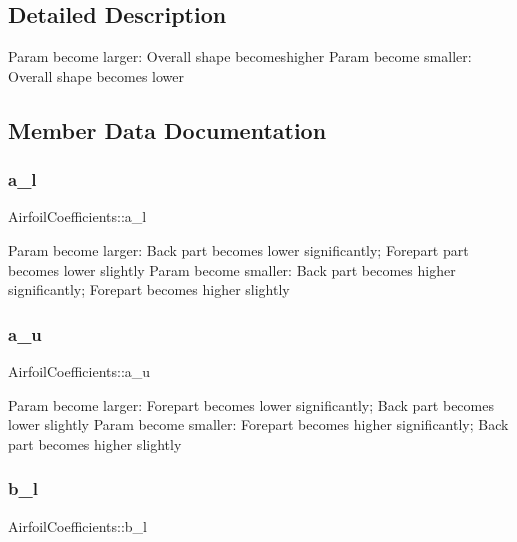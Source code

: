 \subsection{Detailed Description}
Param become larger\+: Overall shape becomeshigher Param become smaller\+: Overall shape becomes lower 

\subsection{Member Data Documentation}
\hypertarget{struct_airfoil_coefficients_a9b8421053a97ec5dcf0bc1cc6dd7e2a1}{}\label{struct_airfoil_coefficients_a9b8421053a97ec5dcf0bc1cc6dd7e2a1} 
\subsubsection{\texorpdfstring{a\+\_\+l}{a\_l}}
{\footnotesize\ttfamily Airfoil\+Coefficients\+::a\+\_\+l}

Param become larger\+: Back part becomes lower significantly; Forepart part becomes lower slightly Param become smaller\+: Back part becomes higher significantly; Forepart becomes higher slightly \hypertarget{struct_airfoil_coefficients_a7987ccdf3ca120dc8b96004cea2808c4}{}\label{struct_airfoil_coefficients_a7987ccdf3ca120dc8b96004cea2808c4} 
\subsubsection{\texorpdfstring{a\+\_\+u}{a\_u}}
{\footnotesize\ttfamily Airfoil\+Coefficients\+::a\+\_\+u}

Param become larger\+: Forepart becomes lower significantly; Back part becomes lower slightly Param become smaller\+: Forepart becomes higher significantly; Back part becomes higher slightly \hypertarget{struct_airfoil_coefficients_ab6c29fe2ddce0a9b700d2a312791995a}{}\label{struct_airfoil_coefficients_ab6c29fe2ddce0a9b700d2a312791995a} 
\subsubsection{\texorpdfstring{b\+\_\+l}{b\_l}}
{\footnotesize\ttfamily Airfoil\+Coefficients\+::b\+\_\+l}

